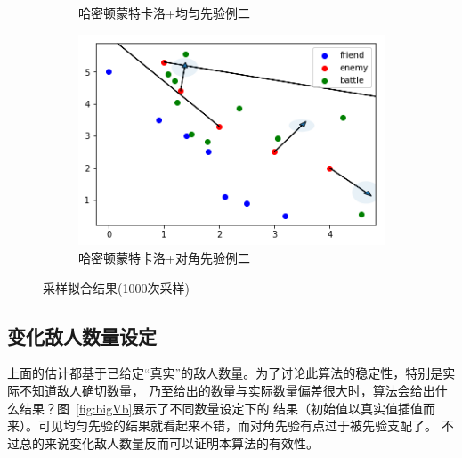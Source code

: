 \documentclass{sicnuthesis}
\begin{document}
\begin{figure}[htb]
\begin{subfigure}[b]{0.45\linewidth}
    \caption{哈密顿蒙特卡洛+均匀先验例二}
  \end{subfigure}
  \begin{subfigure}[b]{0.45\linewidth}
    \includegraphics[width=\linewidth]{Sampling42.png}
    \caption{哈密顿蒙特卡洛+对角先验例二}
  \end{subfigure}
  \caption{采样拟合结果(1000次采样)}
  \label{fig:SamplingTen}
\end{figure}

\subsection{变化敌人数量设定}

上面的估计都基于已给定“真实”的敌人数量。为了讨论此算法的稳定性，特别是实际不知道敌人确切数量，
乃至给出的数量与实际数量偏差很大时，算法会给出什么结果？图~\ref{fig:bigVb}展示了不同数量设定下的
结果（初始值以真实值插值而来）。可见均匀先验的结果就看起来不错，而对角先验有点过于被先验支配了。
不过总的来说变化敌人数量反而可以证明本算法的有效性。
\end{document}
